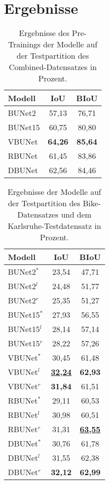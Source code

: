 \chapter{Ergebnisse} \label{sec:results}

\begin{table}[ht]
	\centering
	\begin{tabular}{l|c|c}
		Modell & \ac{IoU} & \ac{BIoU} \\
		\midrule
        BUNet2 & 57,13 & 76,71 \\ 
        BUNet15 & 60,75 & 80,80 \\ 
        VBUNet & \textbf{64,26} & \textbf{85,64} \\ 
        RBUNet & 61,45 & 83,86 \\ 
        DBUNet & 62,56 & 84,46 \\ 
        
	\end{tabular}
	\caption{Ergebnisse des Pre-Trainings der Modelle auf der Testpartition des Combined-Datensatzes in Prozent.}
	\label{tab:results-roads}
\end{table}

\begin{table}[ht]
	\centering
	\begin{tabular}{l|c|c}
		Modell & \ac{IoU} & \ac{BIoU} \\
		\midrule
        BUNet2$^*$ & 23,54 & 47,71 \\ 
        BUNet2$^l$ & 24,48 & 51,77 \\ 
        BUNet2$^r$ & 25,35 & 51,27 \\ 
		\midrule

        BUNet15$^*$ & 27,93 & 56,55 \\ 
        BUNet15$^l$ & 28,14 & 57,14 \\ 
        BUNet15$^r$ & 28,22 & 57,26 \\ 
		\midrule

        VBUNet$^*$ & 30,45 & 61,48 \\ 
        VBUNet$^l$ & \underline{\textbf{32,24}} & \textbf{62,93} \\ 
        VBUNet$^r$ & \textbf{31,84} & 61,51 \\ 
		\midrule

        RBUNet$^*$ & 29,11 & 60,53 \\ 
        RBUNet$^l$ & 30,98 & 60,51 \\ 
        RBUNet$^r$ & 31,31 & \underline{\textbf{63,55}} \\ 
		\midrule

        DBUNet$^*$ & 30,76 & 61,78 \\ 
        DBUNet$^l$ & 31,55 & 62,38 \\ 
        DBUNet$^r$ & \textbf{32,12} & \textbf{62,99} \\ 
        
	\end{tabular}
	\caption{Ergebnisse der Modelle auf der Testpartition des Bike-Datensatzes und dem Karlsruhe-Testdatensatz 
    in Prozent.}
	\label{tab:results}
\end{table}

